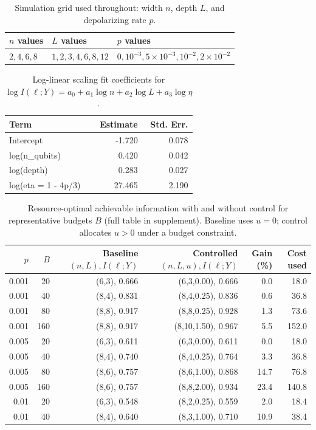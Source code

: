 \documentclass[]{ieeeaccess}
\newcommand{\MI}{I(\ell;Y)}
\begin{document}
\begin{table}[t]
\caption{Simulation grid used throughout: width $n$, depth $L$, and depolarizing rate $p$.}
\label{tab:grid}
\centering
\footnotesize
\begin{tabular}{llp{}}
\toprule
$n$ values & $L$ values & $p$ values\\
\midrule
$2,4,6,8$ & $1,2,3,4,6,8,12$ & $0,10^{-3},5\times10^{-3},10^{-2},2\times10^{-2}$\\
\bottomrule
\end{tabular}
\end{table}
\begin{table}[t]
\caption{Log-linear scaling fit coefficients for $\log \MI = a_0 + a_1\log n + a_2\log L + a_3\log\eta$.}
\label{tab:coeff}
\centering
\begin{tabular}{lrr}
\toprule
Term & Estimate & Std. Err.\\
\midrule
Intercept & -1.720 & 0.078\\
log(n\_qubits) & 0.420 & 0.042\\
log(depth) & 0.283 & 0.027\\
log(eta = 1 - 4p/3) & 27.465 & 2.190\\
\bottomrule
\end{tabular}
\end{table}
\begin{table}[t]
\caption{Resource-optimal achievable information with and without control for representative budgets $B$ (full table in supplement). Baseline uses $u=0$; control allocates $u>0$ under a budget constraint.}
\label{tab:budget}
\centering
\scriptsize
\begin{tabular}{rrrrrr}
\toprule
$p$ & $B$ & Baseline $(n,L),\MI$ & Controlled $(n,L,u),\MI$ & Gain (\%) & Cost used\\
\midrule
0.001 & 20 & (6,3), 0.666 & (6,3,0.00), 0.666 & 0.0 & 18.0\\
0.001 & 40 & (8,4), 0.831 & (8,4,0.25), 0.836 & 0.6 & 36.8\\
0.001 & 80 & (8,8), 0.917 & (8,8,0.25), 0.928 & 1.3 & 73.6\\
0.001 & 160 & (8,8), 0.917 & (8,10,1.50), 0.967 & 5.5 & 152.0\\
0.005 & 20 & (6,3), 0.611 & (6,3,0.00), 0.611 & 0.0 & 18.0\\
0.005 & 40 & (8,4), 0.740 & (8,4,0.25), 0.764 & 3.3 & 36.8\\
0.005 & 80 & (8,6), 0.757 & (8,6,1.00), 0.868 & 14.7 & 76.8\\
0.005 & 160 & (8,6), 0.757 & (8,8,2.00), 0.934 & 23.4 & 140.8\\
0.01 & 20 & (6,3), 0.548 & (8,2,0.25), 0.559 & 2.0 & 18.4\\
0.01 & 40 & (8,4), 0.640 & (8,3,1.00), 0.710 & 10.9 & 38.4\\
\bottomrule
\end{tabular}
\end{table}
\end{document}
